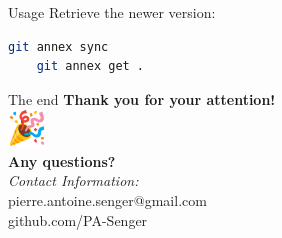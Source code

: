 \begin{frame}[fragile]{Usage}
  Retrieve the newer version:
  \begin{lstlisting}[language=bash]
    git annex sync
    git annex get .
  \end{lstlisting}
\end{frame}

\begin{frame}{The end}
  \Large
  \centering
  \textbf{Thank you for your attention!} \\
  \vspace{1em}
  \includegraphics[height=1cm]{party-emoji.png} \\
  \vspace{1em}
  \textbf{Any questions?} \\
  \vspace{2em}
  \small
  \textit{Contact Information:} \\
  pierre.antoine.senger@gmail.com \\
  github.com/PA-Senger
\end{frame}

\printbibliography

